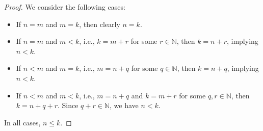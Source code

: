 \documentclass[10pt]{article}
\newenvironment{problem}[2][Problem]{\begin{trivlist}
\item[\hskip \labelsep {\bfseries #1}\hskip \labelsep {\bfseries #2.}]}{\end{trivlist}}
\begin{document}
\begin{problem}{3}
\begin{enumerate}
            \begin{proof}
                We consider the following cases:
                \begin{itemize}
                    \item If \( n = m \) and \( m = k \), then clearly \( n = k \).
                    \item If \( n = m \) and \( m < k \), i.e., \( k = m + r \) for some \( r \in \mathbb{N} \), then \( k = n + r \), implying \( n < k \).
                    \item If \( n < m \) and \( m = k \), i.e., \( m = n + q \) for some \( q \in \mathbb{N} \), then \( k = n + q \), implying \( n < k \).
                    \item If \( n < m \) and \( m < k \), i.e., \( m = n + q \) and \( k = m + r \) for some \( q, r \in \mathbb{N} \), then \( k = n + q + r \). Since \( q + r \in \mathbb{N} \), we have \( n < k \).
                \end{itemize}

                In all cases, \( n \leq k \).
            \end{proof}

	\end{enumerate}
\end{problem}
\medskip
\end{document}
